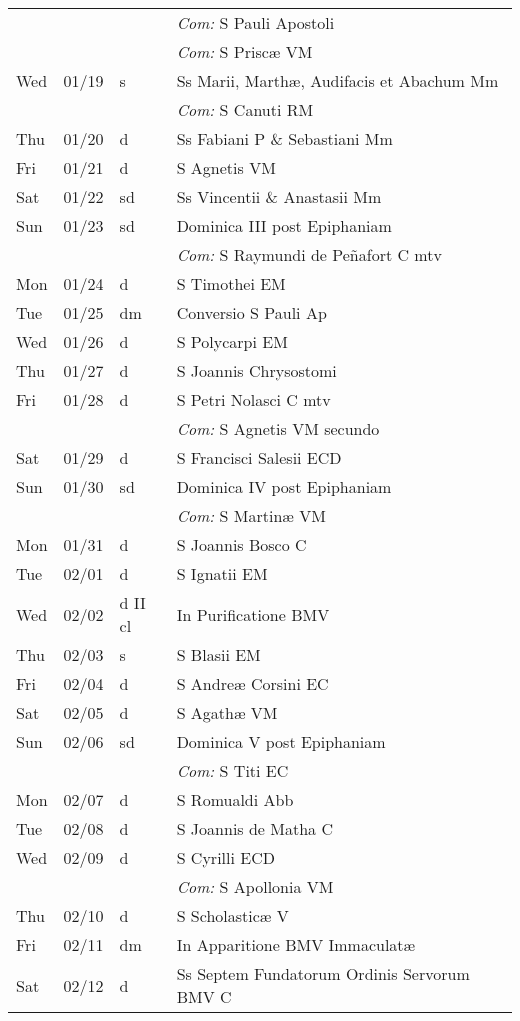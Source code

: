 \documentclass[10pt]{article}
\begin{document}
\begin{longtable}{ l l l l }
 & & & \textit{Com:} S Pauli Apostoli\\
 & & & \textit{Com:} S Priscæ VM\\
Wed & 01/19 & s & Ss Marii, Marthæ, Audifacis et Abachum Mm\\
 & & & \textit{Com:} S Canuti RM\\
Thu & 01/20 & d & Ss Fabiani P \& Sebastiani Mm\\
Fri & 01/21 & d & S Agnetis VM\\
Sat & 01/22 & sd & Ss Vincentii \& Anastasii Mm\\
Sun & 01/23 & sd & Dominica III post Epiphaniam\\
 & & & \textit{Com:} S Raymundi de Peñafort C mtv\\
Mon & 01/24 & d & S Timothei EM\\
Tue & 01/25 & dm & Conversio S Pauli Ap\\
Wed & 01/26 & d & S Polycarpi EM\\
Thu & 01/27 & d & S Joannis Chrysostomi\\
Fri & 01/28 & d & S Petri Nolasci C mtv\\
 & & & \textit{Com:} S Agnetis VM secundo\\
Sat & 01/29 & d & S Francisci Salesii ECD\\
Sun & 01/30 & sd & Dominica IV post Epiphaniam\\
 & & & \textit{Com:} S Martinæ VM\\
Mon & 01/31 & d & S Joannis Bosco C\\
Tue & 02/01 & d & S Ignatii EM\\
Wed & 02/02 & d II cl & In Purificatione BMV\\
Thu & 02/03 & s & S Blasii EM\\
Fri & 02/04 & d & S Andreæ Corsini EC\\
Sat & 02/05 & d & S Agathæ VM\\
Sun & 02/06 & sd & Dominica V post Epiphaniam\\
 & & & \textit{Com:} S Titi EC\\
Mon & 02/07 & d & S Romualdi Abb\\
Tue & 02/08 & d & S Joannis de Matha C\\
Wed & 02/09 & d & S Cyrilli ECD\\
 & & & \textit{Com:} S Apollonia VM\\
Thu & 02/10 & d & S Scholasticæ V\\
Fri & 02/11 & dm & In Apparitione BMV Immaculatæ\\
Sat & 02/12 & d & Ss Septem Fundatorum Ordinis Servorum BMV C\\

\end{longtable}
\end{document}
